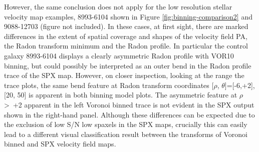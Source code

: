 However, the same conclusion does not apply for the low resolution stellar velocity map examples, 8993-6104 shown in Figure \ref{fig:binning-comparison2} and 9088-12703 (figure not included). In these cases, at first sight, there are marked differences in the extent of spatial coverage and shapes of the velocity field PA, the Radon transform minimum and the Radon profile. In particular the control galaxy 8993-6104 displays a clearly asymmetric Radon profile with VOR10 binning, but could possibly be interpreted as an outer bend in the Radon profile trace of the SPX map. However, on closer inspection, looking at the  range the trace plots, the same bend feature at Radon transform coordinates [$\rho$, $\theta$]=[-6,+2],[20, 50] is apparent in both binning model plots. The asymmetric feature at $\rho$ \textgreater\ +2 apparent in the left Voronoi binned trace is not evident in the SPX output shown in the right-hand panel. Although these differences can be expected due to the exclusion of low S/N low spaxels in the SPX maps, crucially this can easily lead to a different visual classification result between the transforms of Voronoi binned and SPX velocity field maps. 
